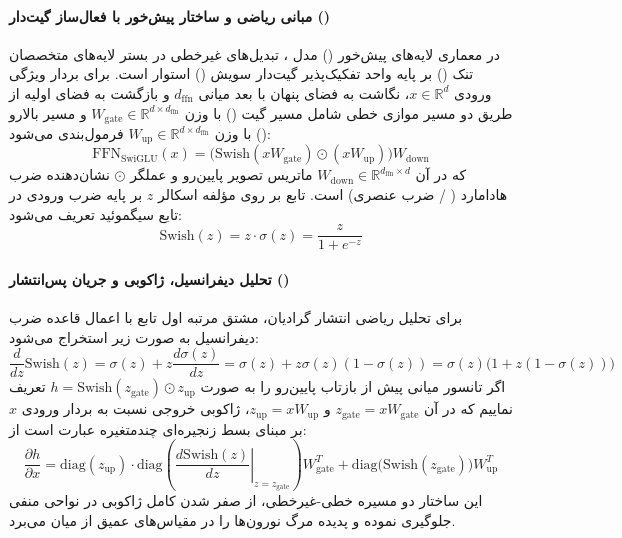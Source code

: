 \item {}

\paragraph*{مبانی ریاضی و ساختار پیش‌خور با فعال‌ساز گیت‌دار ()}
در معماری لایه‌های پیش‌خور () مدل  \cite{deepseek2025v4}، تبدیل‌های غیرخطی در بستر لایه‌های متخصصان تنک () بر پایه واحد تفکیک‌پذیر گیت‌دار سویش () \cite{shazeer2020glu} استوار است. برای بردار ویژگی ورودی $x \in \mathbb{R}^d$، نگاشت به فضای پنهان با بعد میانی $d_{\text{ffn}}$ و بازگشت به فضای اولیه از طریق دو مسیر موازی خطی شامل مسیر گیت () با وزن $W_{\text{gate}} \in \mathbb{R}^{d \times d_{\text{ffn}}}$ و مسیر بالارو () با وزن $W_{\text{up}} \in \mathbb{R}^{d \times d_{\text{ffn}}}$ فرمول‌بندی می‌شود:
\begin{equation}
    \text{FFN}_{\text{SwiGLU}}(x) = \Big( \text{Swish}(x W_{\text{gate}}) \odot (x W_{\text{up}}) \Big) W_{\text{down}}
\end{equation}
که در آن $W_{\text{down}} \in \mathbb{R}^{d_{\text{ffn}} \times d}$ ماتریس تصویر پایین‌رو و عملگر $\odot$ نشان‌دهنده ضرب هادامارد ( / ضرب عنصری) است. تابع  \cite{ramachandran2017swish} بر روی مؤلفه اسکالر $z$ بر پایه ضرب ورودی در تابع سیگموئید تعریف می‌شود:
\begin{equation}
    \text{Swish}(z) = z \cdot \sigma(z) = \frac{z}{1 + e^{-z}}
\end{equation}

\paragraph*{تحلیل دیفرانسیل، ژاکوبی و جریان پس‌انتشار ()}
برای تحلیل ریاضی انتشار گرادیان، مشتق مرتبه اول تابع  با اعمال قاعده ضرب دیفرانسیل به صورت زیر استخراج می‌شود:
\begin{equation}
    \frac{d}{dz}\text{Swish}(z) = \sigma(z) + z \frac{d\sigma(z)}{dz} = \sigma(z) + z \sigma(z)(1 - \sigma(z)) = \sigma(z)\Big(1 + z(1 - \sigma(z))\Big)
\end{equation}
اگر تانسور میانی پیش از بازتاب پایین‌رو را به صورت $h = \text{Swish}(z_{\text{gate}}) \odot z_{\text{up}}$ تعریف نماییم که در آن $z_{\text{gate}} = x W_{\text{gate}}$ و $z_{\text{up}} = x W_{\text{up}}$، ژاکوبی خروجی نسبت به بردار ورودی $x$ بر مبنای بسط زنجیره‌ای چندمتغیره عبارت است از:
\begin{equation}
    \frac{\partial h}{\partial x} = \text{diag}(z_{\text{up}}) \cdot \text{diag}\left(\left.\frac{d\text{Swish}(z)}{dz}\right|_{z=z_{\text{gate}}}\right) W_{\text{gate}}^T + \text{diag}\big(\text{Swish}(z_{\text{gate}})\big) W_{\text{up}}^T
\end{equation}
این ساختار دو مسیره خطی-غیرخطی، از صفر شدن کامل ژاکوبی در نواحی منفی جلوگیری نموده و پدیده مرگ نورون‌ها را در مقیاس‌های عمیق از میان می‌برد.

